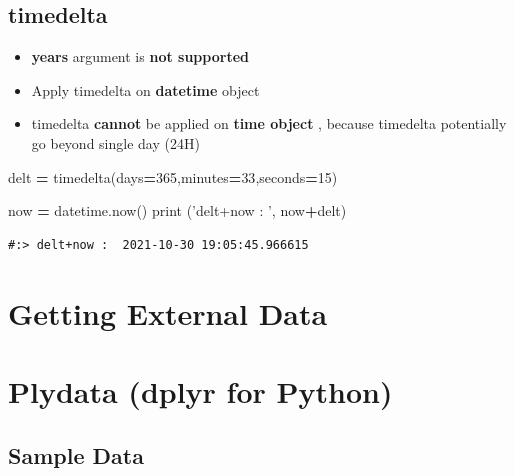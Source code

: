 \documentclass[
]{book}
\newenvironment{Shaded}{\begin{snugshade}}{\end{snugshade}}
\newcommand{\BuiltInTok}[1]{#1}
\newcommand{\DecValTok}[1]{\textcolor[rgb]{0.06,0.06,0.06}{#1}}
\newcommand{\NormalTok}[1]{#1}
\newcommand{\OperatorTok}[1]{\textcolor[rgb]{0.43,0.43,0.43}{\textbf{#1}}}
\newcommand{\StringTok}[1]{\textcolor[rgb]{0.5,0.5,0.5}{#1}}
\providecommand{\tightlist}{%
  \setlength{\itemsep}{0pt}\setlength{\parskip}{0pt}}
\begin{document}
\hypertarget{timedelta}{%
\section{timedelta}\label{timedelta}}

\begin{itemize}
\tightlist
\item
  \textbf{years} argument is \textbf{not supported}\\
\item
  Apply timedelta on \textbf{datetime} object\\
\item
  timedelta \textbf{cannot} be applied on \textbf{time object} , because timedelta potentially go beyond single day (24H)
\end{itemize}

\begin{Shaded}
\begin{Highlighting}[]
\NormalTok{delt }\OperatorTok{=}\NormalTok{ timedelta(days}\OperatorTok{=}\DecValTok{365}\NormalTok{,minutes}\OperatorTok{=}\DecValTok{33}\NormalTok{,seconds}\OperatorTok{=}\DecValTok{15}\NormalTok{)}
\end{Highlighting}
\end{Shaded}

\begin{Shaded}
\begin{Highlighting}[]
\NormalTok{now }\OperatorTok{=}\NormalTok{ datetime.now()}
\BuiltInTok{print}\NormalTok{ (}\StringTok{'delt+now : '}\NormalTok{, now}\OperatorTok{+}\NormalTok{delt)}
\end{Highlighting}
\end{Shaded}

\begin{verbatim}
#:> delt+now :  2021-10-30 19:05:45.966615
\end{verbatim}

\hypertarget{getting-external-data}{%
\chapter{Getting External Data}\label{getting-external-data}}

\hypertarget{plydata-dplyr-for-python}{%
\chapter{Plydata (dplyr for Python)}\label{plydata-dplyr-for-python}}

\hypertarget{sample-data}{%
\section{Sample Data}\label{sample-data}}
\end{document}
